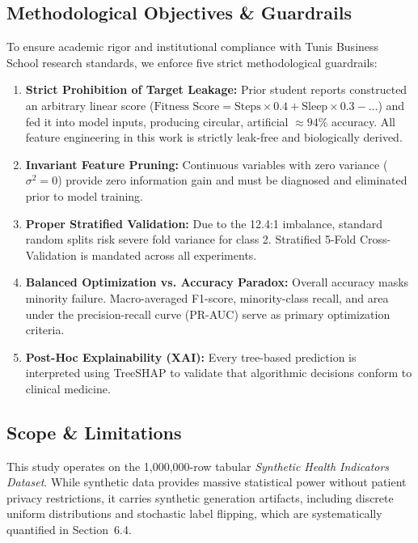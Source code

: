 \documentclass[11pt,a4paper]{article}
\begin{document}
\subsection{Methodological Objectives \& Guardrails}
To ensure academic rigor and institutional compliance with Tunis Business School research standards, we enforce five strict methodological guardrails:
\begin{enumerate}[leftmargin=*,itemsep=1pt]
    \item \textbf{Strict Prohibition of Target Leakage:} Prior student reports constructed an arbitrary linear score ($\text{Fitness Score} = \text{Steps} \times 0.4 + \text{Sleep} \times 0.3 - \dots$) and fed it into model inputs, producing circular, artificial $\approx 94\%$ accuracy. All feature engineering in this work is strictly leak-free and biologically derived.
    \item \textbf{Invariant Feature Pruning:} Continuous variables with zero variance ($\sigma^2 = 0$) provide zero information gain and must be diagnosed and eliminated prior to model training.
    \item \textbf{Proper Stratified Validation:} Due to the 12.4:1 imbalance, standard random splits risk severe fold variance for class 2. Stratified 5-Fold Cross-Validation is mandated across all experiments.
    \item \textbf{Balanced Optimization vs. Accuracy Paradox:} Overall accuracy masks minority failure. Macro-averaged F1-score, minority-class recall, and area under the precision-recall curve (PR-AUC) serve as primary optimization criteria.
    \item \textbf{Post-Hoc Explainability (XAI):} Every tree-based prediction is interpreted using TreeSHAP to validate that algorithmic decisions conform to clinical medicine.
\end{enumerate}

\subsection{Scope \& Limitations}
This study operates on the 1,000,000-row tabular \emph{Synthetic Health Indicators Dataset}. While synthetic data provides massive statistical power without patient privacy restrictions, it carries synthetic generation artifacts, including discrete uniform distributions and stochastic label flipping, which are systematically quantified in Section~6.4.
\end{document}
